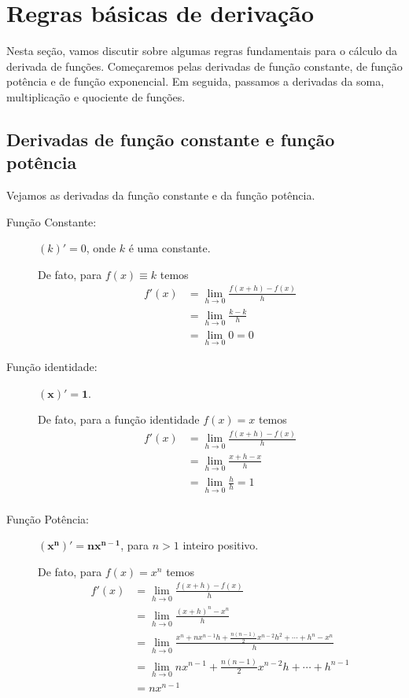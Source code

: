 \cleardoublepage\documentclass[../main.tex]{subfiles}
\begin{document}
\section{Regras básicas de derivação}\label{cap_deriv_sec_regras}

Nesta seção, vamos discutir sobre algumas regras fundamentais para o cálculo da derivada de funções. Começaremos pelas derivadas de função constante, de função potência e de função exponencial. Em seguida, passamos a derivadas da soma, multiplicação e quociente de funções.

\subsection{Derivadas de função constante e função potência}

Vejamos as derivadas da função constante e da função potência.
\begin{description}
\item[Função Constante:]

$(k)' = 0$, onde $k$ é uma constante.

  De fato, para $f(x) \equiv k$ temos
  \begin{align*}
    f'(x) &= \lim_{h\to 0} \frac{f(x+h)-f(x)}{h}\\
          &= \lim_{h\to 0} \frac{k-k}{h} \\
          &= \lim_{h\to 0} 0 = 0
  \end{align*}

\item[Função identidade:]

$\boldsymbol{(x)' = 1}$.

  De fato, para a função identidade $f(x) = x$ temos
  \begin{align*}
    f'(x) &= \lim_{h\to 0} \frac{f(x+h)-f(x)}{h}\\
          &= \lim_{h\to 0} \frac{x+h-x}{h}\\
          &= \lim_{h\to 0} \frac{h}{h} = 1\\
  \end{align*}

\item[Função Potência:]

$\boldsymbol{(x^n)' = nx^{n-1}}$, para $n > 1$ inteiro positivo.

  De fato, para $f(x) = x^n$ temos
  \begin{align*}
    f'(x) &= \lim_{h\to 0} \frac{f(x+h)-f(x)}{h}\\
          &= \lim_{h\to 0} \frac{(x+h)^n-x^n}{h} \\
          &= \lim_{h\to 0} \frac{x^n+nx^{n-1}h+\frac{n(n-1)}{2}x^{n-2}h^2 + \cdots +h^n-x^n}{h}\\
          &= \lim_{h\to 0} nx^{n-1}+\frac{n(n-1)}{2}x^{n-2}h+\cdots+h^{n-1}\\
          &= nx^{n-1}
  \end{align*}
\end{description}
\end{document}
